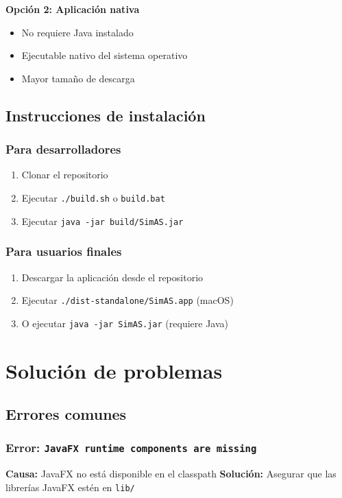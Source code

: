 \textbf{Opción 2: Aplicación nativa}
\begin{itemize}
    \item No requiere Java instalado
    \item Ejecutable nativo del sistema operativo
    \item Mayor tamaño de descarga
\end{itemize}

\subsection{Instrucciones de instalación}

\subsubsection{Para desarrolladores}
\begin{enumerate}
    \item Clonar el repositorio
    \item Ejecutar \texttt{./build.sh} o \texttt{build.bat}
    \item Ejecutar \texttt{java -jar build/SimAS.jar}
\end{enumerate}

\subsubsection{Para usuarios finales}
\begin{enumerate}
    \item Descargar la aplicación desde el repositorio
    \item Ejecutar \texttt{./dist-standalone/SimAS.app} (macOS)
    \item O ejecutar \texttt{java -jar SimAS.jar} (requiere Java)
\end{enumerate}

\section{Solución de problemas}

\subsection{Errores comunes}

\subsubsection{Error: \texttt{JavaFX runtime components are missing}}
\textbf{Causa:} JavaFX no está disponible en el classpath
\textbf{Solución:} Asegurar que las librerías JavaFX estén en \texttt{lib/}

